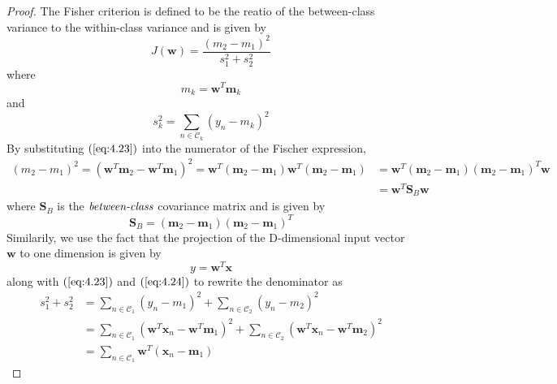 \begin{proof}
    The Fisher criterion is defined to be the reatio of the between-class
    variance to the within-class variance and is given by
    \begin{equation}\label{eq:4.25}\tag{4.25}
        J(\mathbf{w}) = \frac{(m_2 - m_1)^2}{s_1^2 + s_2^2}
    \end{equation}
    where 
    \begin{equation}\label{eq:4.23}\tag{4.23}
        m_k = \mathbf{w}^T\mathbf{m}_k
    \end{equation}
    and
    \begin{equation}\label{eq:4.24}\tag{4.24}
        s_k^2 = \sum_{n \in \mathcal{C}_k} (y_n - m_k)^2
    \end{equation}
    By substituting $(\ref{eq:4.23})$ into the numerator of the Fischer expression,
    \begin{align*}
        (m_2 - m_1)^2 
        = (\mathbf{w}^T\mathbf{m}_2 - \mathbf{w}^T\mathbf{m}_1)^2
        = \mathbf{w}^T(\mathbf{m}_2 - \mathbf{m}_1)\mathbf{w}^T(\mathbf{m}_2 - \mathbf{m}_1)
        &= \mathbf{w}^T(\mathbf{m}_2 - \mathbf{m}_1)(\mathbf{m}_2 - \mathbf{m}_1)^T\mathbf{w} \\
        &= \mathbf{w}^T\mathbf{S}_B\mathbf{w}
    \end{align*}
    where $\mathbf{S}_B$ is the $\emph{between-class}$ covariance matrix and is given by
    \begin{equation}\label{eq:4.27}\tag{4.27}
        \mathbf{S}_B = (\mathbf{m}_2 - \mathbf{m}_1)(\mathbf{m}_2 - \mathbf{m}_1)^T
    \end{equation}
    Similarily, we use the fact that the projection of the D-dimensional input vector
    $\mathbf{w}$ to one dimension is given by
    \begin{equation}\label{eq:4.20}\tag{4.20}
        y = \mathbf{w}^T\mathbf{x}
    \end{equation}
    along with $(\ref{eq:4.23})$ and $(\ref{eq:4.24})$ to rewrite the denominator as 
    \begin{align*}
        s_1^2 + s_2^2
        &= \sum_{n \in \mathcal{C}_1} (y_n - m_1)^2 + \sum_{n \in \mathcal{C}_2} (y_n - m_2)^2 \\
        &= \sum_{n \in \mathcal{C}_1} (\mathbf{w}^T\mathbf{x}_n - \mathbf{w}^T\mathbf{m}_1)^2 
            + \sum_{n \in \mathcal{C}_2} (\mathbf{w}^T\mathbf{x}_n - \mathbf{w}^T\mathbf{m}_2)^2 \\
        &= \sum_{n \in \mathcal{C}_1} \mathbf{w}^T(\mathbf{x}_n - \mathbf{m}_1)

\end{align*}
\end{proof}
